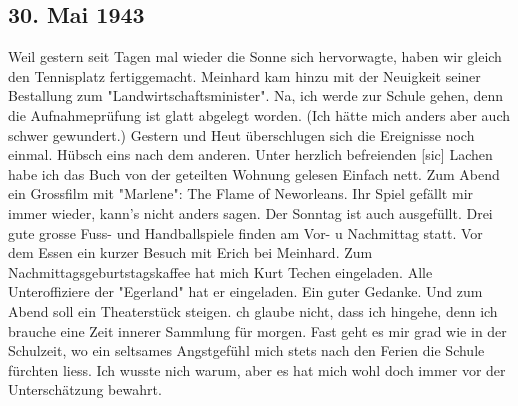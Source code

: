 \subsection{30. Mai 1943}

Weil gestern seit Tagen mal wieder die Sonne sich hervorwagte, haben wir gleich den Tennisplatz fertiggemacht.
Meinhard kam hinzu mit der Neuigkeit seiner Bestallung zum "Landwirtschaftsminister".
Na, ich werde zur Schule gehen, denn die Aufnahmepr\"{u}fung ist glatt abgelegt worden.
(Ich h\"{a}tte mich anders aber auch schwer gewundert.)
Gestern und Heut \"{u}berschlugen sich die Ereignisse noch einmal.
H\"{u}bsch eins nach dem anderen.
Unter herzlich befreienden{\color{red} [sic] } Lachen habe ich das Buch von der geteilten Wohnung gelesen
Einfach nett.
Zum Abend ein Grossfilm mit "Marlene": The Flame of Neworleans.
Ihr Spiel gef\"{a}llt mir immer wieder, kann's nicht anders sagen.
Der Sonntag ist auch ausgef\"{u}llt.
Drei gute grosse Fuss- und Handballspiele finden am Vor- u Nachmittag statt.
Vor dem Essen ein kurzer Besuch mit Erich bei Meinhard.
Zum Nachmittagsgeburtstagskaffee hat mich Kurt Techen eingeladen.
Alle Unteroffiziere der "Egerland" hat er eingeladen.
Ein guter Gedanke.
Und zum Abend soll ein Theaterst\"{u}ck steigen.
ch glaube nicht, dass ich hingehe, denn ich brauche eine Zeit innerer Sammlung f\"{u}r morgen.
Fast geht es mir grad wie in der Schulzeit, wo ein seltsames Angstgef\"{u}hl mich stets nach den Ferien die Schule f\"{u}rchten liess.
Ich wusste nich warum, aber es hat mich wohl doch immer vor der Untersch\"{a}tzung bewahrt.

\clearpage

